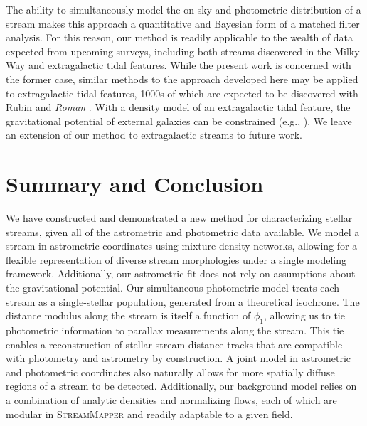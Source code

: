 \documentclass[twocolumn]{aastex631}
\newcommand{\code}[1]{\textsc{#1}}
\newcommand{\package}[1]{\code{#1}}
\begin{document}
        The ability to simultaneously model the on-sky and photometric
        distribution of a stream makes this approach a quantitative and Bayesian
        form of a matched filter analysis. For this reason, our method is
        readily applicable to the wealth of data expected from upcoming surveys,
        including both streams discovered in the Milky Way and extragalactic
        tidal features. While the present work is concerned with the former
        case, similar methods to the approach developed here may be applied to
        extragalactic tidal features, 1000s of which are expected to be
        discovered with Rubin \citep{Ivezic+2019} and \textit{Roman}
        \citep{Spergel+2013}. With a density model of an extragalactic tidal
        feature, the gravitational potential of external galaxies can be
        constrained (e.g., \citealt{Fardal+2013, Pearson+2022, Nibauer+2023}).
        We leave an extension of our method to extragalactic streams to future
        work.
        



\section{Summary and Conclusion} \label{sec:conclusions}

    We have constructed and demonstrated a new method for characterizing stellar
    streams, given all of the astrometric and photometric data available. We
    model a stream in astrometric coordinates using mixture density networks,
    allowing for a flexible representation of diverse stream morphologies under
    a single modeling framework. Additionally, our astrometric fit does not rely
    on assumptions about the gravitational potential. Our simultaneous
    photometric model treats each stream as a single-stellar population,
    generated from a theoretical isochrone. The distance modulus along the
    stream is itself a function of $\phi_1$, allowing us to tie photometric
    information to parallax measurements along the stream. This tie enables a
    reconstruction of stellar stream distance tracks that are compatible with
    photometry and astrometry by construction. A joint model in astrometric and
    photometric coordinates also naturally allows for more spatially diffuse
    regions of a stream to be detected. Additionally, our background model
    relies on a combination of analytic densities and normalizing flows, each of
    which are modular in \package{StreamMapper} and readily adaptable to a given
    field. 
\end{document}

